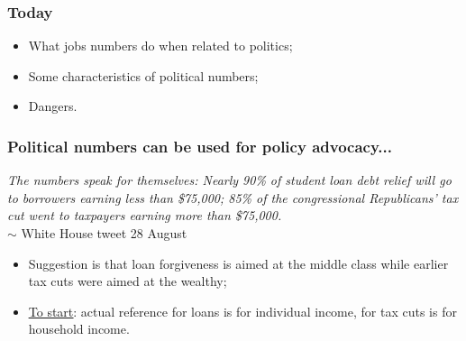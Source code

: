 \documentclass[aspectratio=169]{beamer}
\theoremstyle{principle}
\begin{document}
\begin{frame}
\frametitle{Today}
\begin{itemize}
\item What jobs numbers do when related to politics;
\bigskip
\bigskip
\item Some characteristics of political numbers;
\bigskip
\bigskip
\item Dangers.
\end{itemize}

\end{frame}

%

\begin{frame}
\frametitle{Political numbers can be used for policy advocacy...}
\begin{center}
\textit{The numbers speak for themselves: Nearly 90\% of student loan debt relief will go to borrowers earning less than \$75,000; 85\% of the congressional Republicans’ tax cut went to taxpayers earning more than \$75,000.}\\
\bigskip
\hspace{70mm}$\sim$ White House tweet 28 August
\end{center}
\bigskip
\begin{itemize}
\item Suggestion is that loan forgiveness is aimed at the middle class while earlier tax cuts were aimed at the wealthy;
\bigskip
\bigskip
\item \href{https://www.washingtonpost.com/politics/2022/08/30/white-houses-tricky-comparison-between-student-loan-relief-gop-tax-cuts/}{\color{blue}\underline{To start}}\color{black}: actual reference for loans is for individual income, for tax cuts is for household income.
\end{itemize}

\end{frame}
\end{document}
